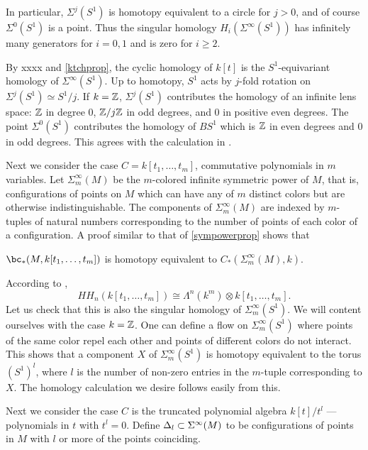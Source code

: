 In particular, $\Sigma^j(S^1)$ is homotopy equivalent to a circle for $j>0$, and
of course $\Sigma^0(S^1)$ is a point.
Thus the singular homology $H_i(\Sigma^\infty(S^1))$ has infinitely many generators for $i=0,1$
and is zero for $i\ge 2$.

By xxxx and \ref{ktchprop}, 
the cyclic homology of $k[t]$ is the $S^1$-equivariant homology of $\Sigma^\infty(S^1)$.
Up to homotopy, $S^1$ acts by $j$-fold rotation on $\Sigma^j(S^1) \simeq S^1/j$.
If $k = \mathbb{Z}$, $\Sigma^j(S^1)$ contributes the homology of an infinite lens space: $\mathbb{Z}$ in degree
0, $\mathbb{Z}/j \mathbb{Z}$ in odd degrees, and 0 in positive even degrees.
The point $\Sigma^0(S^1)$ contributes the homology of $BS^1$ which is $\mathbb{Z}$ in even 
degrees and 0 in odd degrees.
This agrees with the calculation in \cite[3.1.7]{MR1600246}.

\medskip

Next we consider the case $C = k[t_1, \ldots, t_m]$, commutative polynomials in $m$ variables.
Let $\Sigma_m^\infty(M)$ be the $m$-colored infinite symmetric power of $M$, that is, configurations
of points on $M$ which can have any of $m$ distinct colors but are otherwise indistinguishable.
The components of $\Sigma_m^\infty(M)$ are indexed by $m$-tuples of natural numbers
corresponding to the number of points of each color of a configuration.
A proof similar to that of \ref{sympowerprop} shows that

\begin{prop}
$\bc_*(M, k[t_1, \ldots, t_m])$ is homotopy equivalent to $C_*(\Sigma_m^\infty(M), k)$.
\end{prop}

According to \cite[3.2.2]{MR1600246},
\[
	HH_n(k[t_1, \ldots, t_m]) \cong \Lambda^n(k^m) \otimes k[t_1, \ldots, t_m] .
\]
Let us check that this is also the singular homology of $\Sigma_m^\infty(S^1)$.
We will content ourselves with the case $k = \mathbb{Z}$.
One can define a flow on $\Sigma_m^\infty(S^1)$ where points of the same color repel each other and points of different colors do not interact.
This shows that a component $X$ of $\Sigma_m^\infty(S^1)$ is homotopy equivalent
to the torus $(S^1)^l$, where $l$ is the number of non-zero entries in the $m$-tuple
corresponding to $X$.
The homology calculation we desire follows easily from this.


\medskip

Next we consider the case $C$ is the truncated polynomial
algebra $k[t]/t^l$ --- polynomials in $t$ with $t^l = 0$.
Define $\Delta_l \subset \Sigma^\infty(M)$ to be configurations of points in $M$ with $l$ or
more of the points coinciding.

